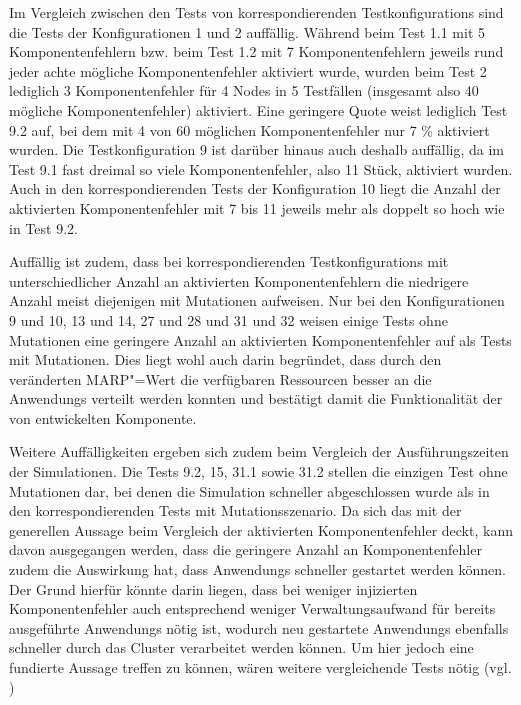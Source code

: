 Im Vergleich zwischen den \glspl{Test} von korrespondierenden \glspl{Testkonfiguration} sind die \glspl{Test} der Konfigurationen 1 und 2 auffällig.
Während beim \gls{Test} 1.1 mit 5 Komponentenfehlern bzw. beim \gls{Test} 1.2 mit 7 Komponentenfehlern jeweils rund jeder achte mögliche Komponentenfehler aktiviert wurde, wurden beim \gls{Test} 2 lediglich 3 Komponentenfehler für 4 Nodes in 5 Testfällen (insgesamt also 40 mögliche Komponentenfehler) aktiviert.
Eine geringere Quote weist lediglich \gls{Test} 9.2 auf, bei dem mit 4 von 60 möglichen Komponentenfehler nur 7 \% aktiviert wurden.
Die \gls{Testkonfiguration} 9 ist darüber hinaus auch deshalb auffällig, da im \gls{Test} 9.1 fast dreimal so viele Komponentenfehler, also 11 Stück, aktiviert wurden.
Auch in den korrespondierenden \glspl{Test} der Konfiguration 10 liegt die Anzahl der aktivierten Komponentenfehler mit 7 bis 11 jeweils mehr als doppelt so hoch wie in \gls{Test} 9.2.

Auffällig ist zudem, dass bei korrespondierenden \glspl{Testkonfiguration} mit unterschiedlicher Anzahl an aktivierten Komponentenfehlern die niedrigere Anzahl meist diejenigen mit Mutationen aufweisen.
Nur bei den Konfigurationen 9 und 10, 13 und 14, 27 und 28 und 31 und 32 weisen einige \glspl{Test} ohne Mutationen eine geringere Anzahl an aktivierten Komponentenfehler auf als \glspl{Test} mit Mutationen.
Dies liegt wohl auch darin begründet, dass durch den veränderten \gls{MARP}"=Wert die verfügbaren Ressourcen besser an die \glspl{Anwendung} verteilt werden konnten und bestätigt damit die Funktionalität der von \citeauthor{Zhang2016} entwickelten Komponente.

Weitere Auffälligkeiten ergeben sich zudem beim Vergleich der Ausführungszeiten der Simulationen.
Die \glspl{Test} 9.2, 15, 31.1 sowie 31.2 stellen die einzigen \gls{Test} ohne Mutationen dar, bei denen die Simulation schneller abgeschlossen wurde als in den korrespondierenden \glspl{Test} mit Mutationsszenario.
Da sich das mit der generellen Aussage beim Vergleich der aktivierten Komponentenfehler deckt, kann davon ausgegangen werden, dass die geringere Anzahl an Komponentenfehler zudem die Auswirkung hat, dass \glspl{Anwendung} schneller gestartet werden können.
Der Grund hierfür könnte darin liegen, dass bei weniger injizierten Komponentenfehler auch entsprechend weniger Verwaltungsaufwand für bereits ausgeführte \glspl{Anwendung} nötig ist, wodurch neu gestartete \glspl{Anwendung} ebenfalls schneller durch das Cluster verarbeitet werden können.
Um hier jedoch eine fundierte Aussage treffen zu können, wären weitere vergleichende \glspl{Test} nötig (vgl. )

